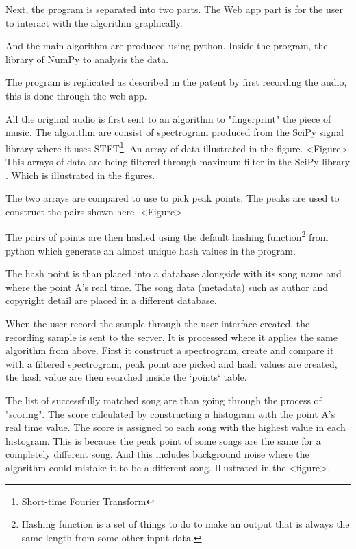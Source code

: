 Next, the program is separated into two parts. The Web app part is for the user to interact with the algorithm graphically. 

And the main algorithm are produced using python. Inside the program, the library of NumPy\cite{harris_array_2020} to analysis the data.

The program is replicated as described in the patent by first recording the audio, this is done through the web app. 

All the original audio is first sent to an algorithm to "fingerprint" the piece of music. The algorithm are consist of spectrogram produced from the SciPy signal library where it uses STFT\footnote{Short-time Fourier Transform}.\cite{virtanen_scipy_2020} An array of data illustrated in the figure. <Figure> This arrays of data are being filtered through maximum filter in the SciPy library \cite{virtanen_scipy_2020}. Which is illustrated in the figures.

The two arrays are compared to use to pick peak points. The peaks are used to construct the pairs shown here. <Figure>

The pairs of points are then hashed using the default hashing function\footnote{Hashing function is a set of things to do to make an output that is always the same length from some other input data.\cite{noauthor_hash_2024}} from python which generate an almost unique hash values in the program.

The hash point is than placed into a database alongside with its song name and where the point A's real time. The song data (metadata) such as author and copyright detail are placed in a different database.

When the user record the sample through the user interface created, the recording sample is sent to the server. It is processed where it applies the same algorithm from above. First it construct a spectrogram, create and compare it with a filtered spectrogram, peak point are picked and hash values are created, the hash value are then searched inside the `points` table. 

The list of successfully matched song are than going through the process of "scoring". The score calculated by constructing a histogram with the point A's real time value. The score is assigned to each song with the highest value in each histogram. This is because the peak point of some songs are the same for a completely different song. And this includes background noise where the algorithm could mistake it to be a different song. Illustrated in the <figure>.

